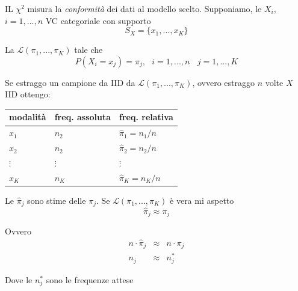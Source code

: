 \documentclass[
  11pt,
]{book}
\theoremstyle{mytheoremstyle}
\theoremstyle{mydefstyle}
\begin{document}
IL \(\chi^2\) misura la \emph{conformità} dei dati al modello scelto.
Supponiamo, le \(X_i\), \(i=1,...,n\) VC categoriale con supporto
\[S_X=\{x_1,...,x_K\}\]

La \(\mathscr{L}(\pi_1,...,\pi_K)\) tale che
\[P(X_i=x_j)=\pi_j,~~~i=1,...,n~~~~j=1,...,K\]

Se estraggo un campione da IID da \(\mathscr{L}(\pi_1,...,\pi_K)\), ovvero
estraggo \(n\) volte \(X\) IID ottengo:

\begin{longtable}[]{@{}lll@{}}
\toprule\noalign{}
modalità & freq. assoluta & freq. relativa \\
\midrule\noalign{}
\endhead
\bottomrule\noalign{}
\endlastfoot
\(x_1\) & \(n_2\) & \(\hat\pi_1=n_1/n\) \\
\(x_2\) & \(n_2\) & \(\hat\pi_2=n_2/n\) \\
\(\vdots\) & \(\vdots\) & \(\vdots\) \\
\(x_K\) & \(n_K\) & \(\hat\pi_K=n_K/n\) \\
\end{longtable}

Le \(\hat\pi_j\) sono stime delle \(\pi_j\).
Se \(\mathscr{L}(\pi_1,...,\pi_K)\) è vera mi aspetto
\[\hat\pi_j\approx\pi_j\]

Ovvero
\begin{eqnarray*}
  n\cdot\hat\pi_j &\approx& n\cdot\pi_j\\
 n_j &\approx& n_j^*
\end{eqnarray*}

Dove le \(n_j^*\) sono le frequenze attese
\end{document}
